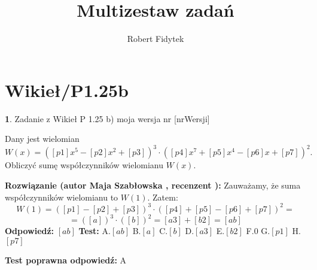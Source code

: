 \documentclass[12pt, a4paper]{article}
\title{Multizestaw zadań}
\author{Robert Fidytek}
\date{}
\theoremstyle{definition} %
\newtheorem{zad}{}
\newcommand{\kategoria}[1]{\section{#1}} %
\newcommand{\zadStart}[1]{\begin{zad}#1\newline} %
\newcommand{\zadStop}{\end{zad}}   %
\newcommand{\rozwStart}[2]{\noindent \textbf{Rozwiązanie (autor #1 , recenzent #2): }\newline} %
\newcommand{\rozwStop}{\newline}                                            %
\newcommand{\odpStart}{\noindent \textbf{Odpowiedź:}\newline}    %
\newcommand{\odpStop}{\newline}                                             %
\newcommand{\testStart}{\noindent \textbf{Test:}\newline} %
\newcommand{\testStop}{\newline} %
\newcommand{\kluczStart}{\noindent \textbf{Test poprawna odpowiedź:}\newline} %
\newcommand{\kluczStop}{\newline} %
\begin{document}
\maketitle


\kategoria{Wikieł/P1.25b}
\zadStart{Zadanie z Wikieł P 1.25 b)  moja wersja nr [nrWersji]}

Dany jest wielomian $W(x)=([p1]x^{5}-[p2]x^{2}+[p3])^{3}\cdot([p4]x^{7}+[p5]x^{4}-[p6]x+[p7])^{2}.$ Obliczyć sumę współczynników wielomianu $W(x)$.
\zadStop
\rozwStart{Maja Szabłowska}{}
Zauważamy, że suma współczynników wielomianu to $W(1).$ Zatem:
$$W(1)=([p1]-[p2]+[p3])^{3}\cdot([p4]+[p5]-[p6]+[p7])^{2}=$$
$$=([a])^{3}\cdot([b])^{2}=[a3]+[b2]=[ab] $$
\rozwStop
\odpStart
$[ab]$
\odpStop
\testStart
A.$[ab]$
B.$[a]$
C.$[b]$
D.$[a3]$
E.$[b2]$
F.$0$
G.$[p1]$
H.$[p7]$

\testStop
\kluczStart
A
\kluczStop
\end{document}
